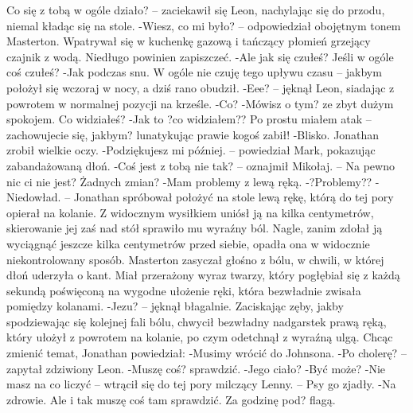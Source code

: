 \documentclass[../MAIN.tex]{subfiles}
\begin{document}
Co się z tobą w ogóle działo? -- zaciekawił się Leon, nachylając się do przodu, niemal kładąc się na stole.
-Wiesz, co mi było? -- odpowiedział obojętnym tonem Masterton. Wpatrywał się w kuchenkę gazową i tańczący płomień grzejący czajnik z wodą. Niedługo powinien zapiszczeć.
-Ale jak się czułeś? Jeśli w ogóle coś czułeś?
-Jak podczas snu. W ogóle nie czuję tego upływu czasu -- jakbym położył się wczoraj w nocy, a dziś rano obudził.
-Eee? -- jęknął Leon, siadając z powrotem w normalnej pozycji na krześle.
-Co?
-Mówisz o tym? ze zbyt dużym spokojem. Co widziałeś?
-Jak to ?co widziałem?? Po prostu miałem atak -- zachowujecie się, jakbym? lunatykując prawie kogoś zabił!
-Blisko.
Jonathan zrobił wielkie oczy.
-Podziękujesz mi później. -- powiedział Mark, pokazując zabandażowaną dłoń.
-Coś jest z tobą nie tak? -- oznajmił Mikołaj. -- Na pewno nic ci nie jest? Żadnych zmian?
-Mam problemy z lewą ręką.
-?Problemy??
-Niedowład. -- Jonathan spróbował położyć na stole lewą rękę, którą do tej pory opierał na kolanie. Z widocznym wysiłkiem uniósł ją na kilka centymetrów, skierowanie jej zaś nad stół sprawiło mu wyraźny ból. Nagle, zanim zdołał ją wyciągnąć jeszcze kilka centymetrów przed siebie, opadła ona w widocznie niekontrolowany sposób.
Masterton zasyczał głośno z bólu, w chwili, w której dłoń uderzyła o kant. Miał przerażony wyraz twarzy, który pogłębiał się z każdą sekundą poświęconą na wygodne ułożenie ręki, która bezwładnie zwisała pomiędzy kolanami.
-Jezu? -- jęknął błagalnie. Zaciskając zęby, jakby spodziewając się kolejnej fali bólu, chwycił bezwładny nadgarstek prawą ręką, który ułożył z powrotem na kolanie, po czym odetchnął z wyraźną ulgą.
Chcąc zmienić temat, Jonathan powiedział:
-Musimy wrócić do Johnsona.
-Po cholerę? -- zapytał zdziwiony Leon.
-Muszę coś? sprawdzić.
-Jego ciało?
-Być może?
-Nie masz na co liczyć -- wtrącił się do tej pory milczący Lenny. -- Psy go zjadły.
-Na zdrowie. Ale i tak muszę coś tam sprawdzić. Za godzinę pod? flagą.
\end{document}
